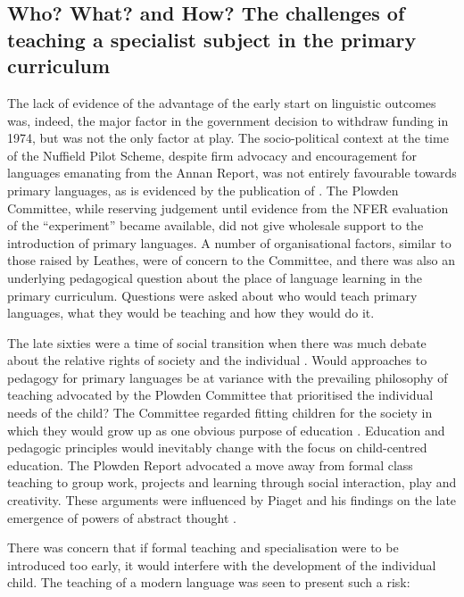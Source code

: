 \documentclass[output=paper]{langscibook}
\begin{document}
\subsection{Who? What? and How? The challenges of teaching a specialist subject in the primary curriculum}

The lack of evidence of the advantage of the early start on linguistic outcomes was, indeed, the major factor in the government decision to withdraw funding in 1974, but was not the only factor at play. The socio-political context at the time of the Nuffield Pilot Scheme, despite firm advocacy and encouragement for languages emanating from the Annan Report, was not entirely favourable towards primary languages, as is evidenced by the publication of \citet{Plowden1967}. The Plowden Committee, while reserving judgement until evidence from the NFER evaluation of the ``experiment'' became available, did not give wholesale support to the introduction of primary languages. A number of organisational factors, similar to those raised by Leathes, were of concern to the Committee, and there was also an underlying pedagogical question about the place of language learning in the primary curriculum. Questions were asked about who would teach primary languages, what they would be teaching and how they would do it. 

The late sixties were a time of social transition when there was much debate about the relative rights of society and the individual \citep[493]{Plowden1967}. Would approaches to pedagogy for primary languages be at variance with the prevailing philosophy of teaching advocated by the Plowden Committee that prioritised the individual needs of the child? The Committee regarded fitting children for the society in which they would grow up as one obvious purpose of education \citep[494]{Plowden1967}. Education and pedagogic principles would inevitably change with the focus on child-centred education. The Plowden Report advocated a move away from formal class teaching to group work, projects and learning through social interaction, play and creativity. These arguments were influenced by Piaget and his findings on the late emergence of powers of abstract thought \citep[371]{Plowden1967}. 

There was concern that if formal teaching and specialisation were to be introduced too early, it would interfere with the development of the individual child. The teaching of a modern language was seen to present such a risk:
\end{document}
